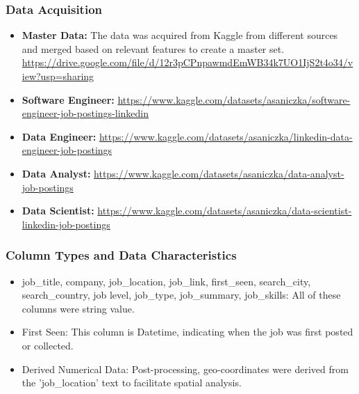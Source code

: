 \documentclass[a4paper,10pt]{article}
\begin{document}
    \subsubsection{Data Acquisition}
    \begin{itemize}
        \item \textbf{Master Data:} The data was acquired from Kaggle from different sources and merged based on relevant features to create a master set. \hyperlink{https://drive.google.com/file/d/12r3pCPnpawmdEmWB34k7UO1IjS2t4o34/view?usp=sharing}{https://drive.google.com/file/d/12r3pCPnpawmdEmWB34k7UO1IjS2t4o34/view?usp=sharing}
        \item \textbf{Software Engineer:} \hyperlink{https://www.kaggle.com/datasets/asaniczka/software-engineer-job-postings-linkedin}{https://www.kaggle.com/datasets/asaniczka/software-engineer-job-postings-linkedin}
        \item \textbf{Data Engineer:} \hyperlink{https://www.kaggle.com/datasets/asaniczka/linkedin-data-engineer-job-postings}{https://www.kaggle.com/datasets/asaniczka/linkedin-data-engineer-job-postings}
        \item \textbf{Data Analyst:} \hyperlink{https://www.kaggle.com/datasets/asaniczka/data-analyst-job-postings}{https://www.kaggle.com/datasets/asaniczka/data-analyst-job-postings}
        \item \textbf{Data Scientist:} \hyperlink{https://www.kaggle.com/datasets/asaniczka/data-scientist-linkedin-job-postings}{https://www.kaggle.com/datasets/asaniczka/data-scientist-linkedin-job-postings}
    \end{itemize}

    
    \subsubsection{Column Types and Data Characteristics}
        \begin{itemize}
        \item job\_title, company, job\_location, job\_link, first\_seen, search\_city, search\_country, job level, job\_type, job\_summary, job\_skills: All of these columns were string value. 
        \item First Seen: This column is Datetime, indicating when the job was first posted or collected.
        \item Derived Numerical Data: Post-processing, geo-coordinates were derived from the 'job\_location' text to facilitate spatial analysis.
    \end{itemize}   
\end{document}
